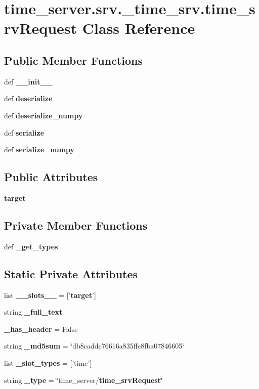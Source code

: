 \section{time\-\_\-server.\-srv.\-\_\-time\-\_\-srv.\-time\-\_\-srv\-Request \-Class \-Reference}
\label{classtime__server_1_1srv_1_1__time__srv_1_1time__srvRequest}
\subsection*{\-Public \-Member \-Functions}
\begin{DoxyCompactItemize}
\item 
def {\bf \-\_\-\-\_\-init\-\_\-\-\_\-}
\item 
def {\bf deserialize}
\item 
def {\bf deserialize\-\_\-numpy}
\item 
def {\bf serialize}
\item 
def {\bf serialize\-\_\-numpy}
\end{DoxyCompactItemize}
\subsection*{\-Public \-Attributes}
\begin{DoxyCompactItemize}
\item 
{\bf target}
\end{DoxyCompactItemize}
\subsection*{\-Private \-Member \-Functions}
\begin{DoxyCompactItemize}
\item 
def {\bf \-\_\-get\-\_\-types}
\end{DoxyCompactItemize}
\subsection*{\-Static \-Private \-Attributes}
\begin{DoxyCompactItemize}
\item 
list {\bf \-\_\-\-\_\-slots\-\_\-\-\_\-} = ['{\bf target}']
\item 
string {\bf \-\_\-full\-\_\-text}
\item 
{\bf \-\_\-has\-\_\-header} = \-False
\item 
string {\bf \-\_\-md5sum} = \char`\"{}db8caddc76616a835ffc8fba07846605\char`\"{}
\item 
list {\bf \-\_\-slot\-\_\-types} = ['time']
\item 
string {\bf \-\_\-type} = \char`\"{}time\-\_\-server/{\bf time\-\_\-srv\-Request}\char`\"{}
\end{DoxyCompactItemize}


